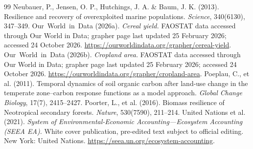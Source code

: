 \documentclass[11pt,a4paper]{article}
\begin{document}
\begin{thebibliography}{99}
 Neubauer, P., Jensen, O. P., Hutchings, J. A. \& Baum, J. K. (2013). Resilience and recovery of overexploited marine populations. \emph{Science}, 340(6130), 347--349.
 Our~World~in~Data (2026a). \emph{Cereal yield.} FAOSTAT data accessed through Our World in Data; grapher page last updated 25 February 2026; accessed 24 October 2026. \url{https://ourworldindata.org/grapher/cereal-yield}.
 Our~World~in~Data (2026b). \emph{Cropland area.} FAOSTAT data accessed through Our World in Data; grapher page last updated 25 February 2026; accessed 24 October 2026. \url{https://ourworldindata.org/grapher/cropland-area}.
 Poeplau, C., et al. (2011). Temporal dynamics of soil organic carbon after land-use change in the temperate zone--carbon response functions as a model approach. \emph{Global Change Biology}, 17(7), 2415--2427.
 Poorter, L., et al. (2016). Biomass resilience of Neotropical secondary forests. \emph{Nature}, 530(7590), 211--214.
 United Nations et al. (2021). \emph{System of Environmental-Economic Accounting---Ecosystem Accounting (SEEA EA).} White cover publication, pre-edited text subject to official editing. New York: United Nations. \url{https://seea.un.org/ecosystem-accounting}.
\end{thebibliography}
\end{document}

